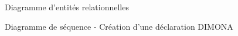 \thispagestyle{empty}

\begin{center}
\begin{figure}[H]
\caption{Diagramme d'entités relationnelles}
\end{figure}
\end{center}

\clearpage
\thispagestyle{empty}

\begin{center}
\begin{figure}[H]
\caption{Diagramme de séquence - Création d'une déclaration DIMONA}
\end{figure}
\end{center}

